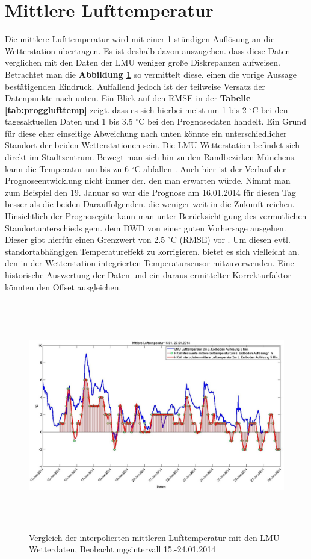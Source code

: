 \section{Mittlere Lufttemperatur}
Die mittlere Lufttemperatur wird mit einer 1 stündigen Auflösung an die Wetterstation übertragen. Es ist deshalb davon auszugehen. dass diese Daten verglichen mit den Daten der LMU weniger große Diskrepanzen aufweisen. Betrachtet man die \textbf{Abbildung \ref{fig:mittlufttemp}} so vermittelt diese. einen die vorige Aussage bestätigenden Eindruck. Auffallend jedoch ist der teilweise Versatz der Datenpunkte nach unten. Ein Blick auf den RMSE in der \textbf{Tabelle \ref{tab:progglufttemp}} zeigt. dass es sich hierbei meist um 1 bis 2 $^\circ$C bei den tagesaktuellen Daten und 1 bis 3.5 $^\circ$C bei den Prognosedaten handelt. Ein Grund für diese eher einseitige Abweichung nach unten könnte ein unterschiedlicher Standort der beiden Wetterstationen sein. Die LMU Wetterstation befindet sich direkt im Stadtzentrum. Bewegt man sich hin zu den Randbezirken Münchens. kann die Temperatur um bis zu 6 $^\circ$C abfallen \cite{stadtklima}. Auch hier ist der Verlauf der Prognoseentwicklung nicht immer der. den man erwarten würde. Nimmt man zum Beispiel den 19. Januar so war die Prognose am 16.01.2014 für diesen Tag besser als die beiden Darauffolgenden. die weniger weit in die Zukunft reichen. Hinsichtlich der Prognosegüte kann man unter Berücksichtigung des vermutlichen Standortunterschieds gem. dem DWD von einer guten Vorhersage ausgehen. Dieser gibt hierfür einen Grenzwert von 2.5 $^\circ$C (RMSE) vor \cite{DWD}. Um diesen evtl. standortabhängigen Temperatureffekt zu korrigieren. bietet es sich vielleicht an. den in der Wetterstation integrierten Temperatursensor mitzuverwenden. Eine historische Auswertung der Daten und ein daraus ermittelter Korrekturfaktor könnten den Offset ausgleichen.        
\begin{figure}[h]
\centering
\includegraphics[width=16cm,height=10cm]{analyse/mittlufttemp2}
\caption{Vergleich der interpolierten mittleren Lufttemperatur mit den LMU Wetterdaten, Beobachtungsintervall 15.-24.01.2014}
\label{fig:mittlufttemp}
\end{figure}
